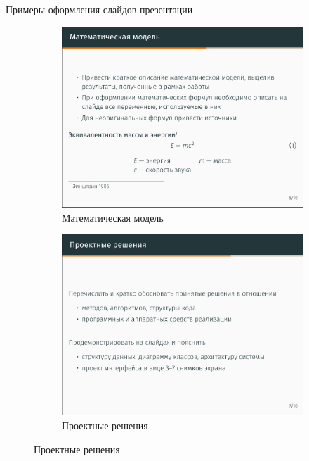 \documentclass{fefu_presentation}
\begin{document}
    \note{}
    
    \begin{frame}{Примеры оформления слайдов презентации}
        \begin{figure}[h]
            \centering
            \begin{subfigure}[t]{0.49\textwidth}
                \includegraphics[width=\textwidth]{slide1.png}
                \caption{Математическая модель}
            \end{subfigure}
            \begin{subfigure}[t]{0.49\textwidth}
                \includegraphics[width=\textwidth]{slide2.png}
                \caption{Проектные решения}
            \end{subfigure}
        \end{figure}
    \end{frame}
\end{document}
